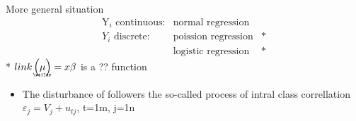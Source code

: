 \documentclass{article}
\begin{document}
\bigskip

More general situation%
\begin{equation*}
\begin{array}{ccc}
\text{Y}_{i}\text{ continuous:} & \text{normal regression} &  \\ 
Y_{i}\text{ discrete:} & \text{poission regression} & \ast \\ 
& \text{logistic regression} & \ast%
\end{array}%
\end{equation*}%
* $link\left( 
\underaccent{\wtilde}{\mu}%
\right) =x\beta $ is a ?? function

\bigskip

\begin{itemize}
\item The disturbance of followers the so-called process of intral class
correllation $\varepsilon _{j}=V_{j}+u_{tj}$, t=1m, j=1n
\end{itemize}

\bigskip
\end{document}

